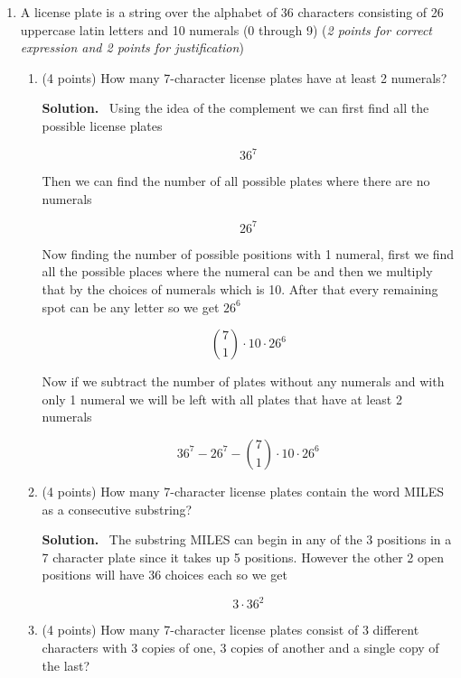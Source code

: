 \documentclass[10pt,letterpaper]{article}
\newenvironment{solution}
  {\par\noindent\textbf{Solution.}\ }
  {\par}
\begin{document}
\begin{enumerate}
\item
A license plate is a string over the alphabet of 36 characters consisting of 26 uppercase latin letters and 10 numerals (0 through 9) (\emph{2 points for correct expression and 2 points for justification})

\begin{enumerate}


\item
(4 points)
How many 7-character license plates have at least 2 numerals?

\begin{solution}
    Using the idea of the complement we can first find all the possible license plates

    \[36^{7}\]

    Then we can find the number of all possible plates where there are no numerals

    \[26^{7}\]

    Now finding the number of possible positions with 1 numeral, first we find all the possible places where the numeral can be and then we multiply that by the choices of numerals which is 10. After that every remaining spot can be any letter so we get \(26^{6}\)

    \[\binom{7}{1} \cdot 10 \cdot 26^{6}\]    

    Now if we subtract the number of plates without any numerals and with only 1 numeral we will be left with all plates that have at least 2 numerals

    \[36^{7}-26^{7}- \binom{7}{1} \cdot 10 \cdot 26^{6}\]
            
\end{solution}

\item
(4 points)
How many 7-character license plates contain the word MILES as a consecutive substring?

\begin{solution}
    The substring MILES can begin in any of the 3 positions in a 7 character plate since it takes up 5 positions. However the other 2 open positions will have 36 choices each so we get

    \[3\cdot 36^{2}\]

\end{solution}

\item
(4 points)
How many 7-character license plates consist of 3 different characters with 3 copies of one, 3 copies of another and a single copy of the last?


\end{enumerate}
\end{enumerate}
\end{document}
